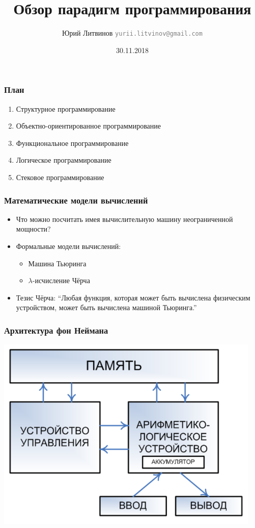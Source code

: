 \documentclass[xetex,mathserif,serif]{beamer}
\title{Обзор парадигм программирования}
\author[Юрий Литвинов]{Юрий Литвинов \newline \textcolor{gray}{\small\texttt{yurii.litvinov@gmail.com}}}
\date{30.11.2018}
\begin{document}
	
	\frame{\titlepage}

	\begin{frame}
		\frametitle{План}
		\begin{enumerate}
			\item Структурное программирование
			\item Объектно-ориентированное программирование
			\item Функциональное программирование
			\item Логическое программирование
			\item Стековое программирование
		\end{enumerate}
	\end{frame}

	\begin{frame}
		\frametitle{Математические модели вычислений}
		\begin{itemize}
			\item Что можно посчитать имея вычислительную машину неограниченной мощности?
			\item Формальные модели вычислений:
			\begin{itemize}
				\item Машина Тьюринга
				\item $\lambda$-исчисление Чёрча
			\end{itemize}
			\item Тезис Чёрча: ``Любая функция, которая может быть вычислена физическим устройством, может быть вычислена машиной Тьюринга.''
		\end{itemize}
	\end{frame}

	\begin{frame}
		\frametitle{Архитектура фон Неймана}
		\begin{center}
			\includegraphics[width=0.95\textwidth]{von-neumann-architecture.png}
		\end{center}
	\end{frame}
\end{document}
